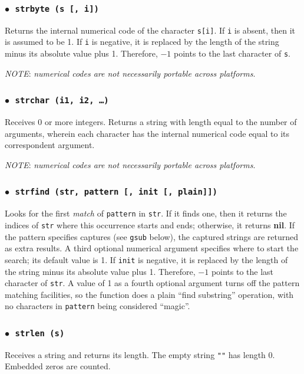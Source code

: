 \documentclass[11pt]{article}
\newcommand{\T}[1]{{\tt #1}}
\newcommand{\Math}[1]{$#1$}
\newcommand{\nil}{{\bf nil}}
\newcommand{\Deffunc}[1]{\index{#1}}
\newcommand{\ff}{$\bullet$\ }
\newcommand{\NOTE}{\par\noindent\emph{NOTE}: }
\begin{document}
\subsubsection*{\ff \T{strbyte (s [, i])}}\Deffunc{strbyte}
Returns the internal numerical code of the character \verb|s[i]|.
If \verb|i| is absent, then it is assumed to be 1.
If \verb|i| is negative,
it is replaced by the length of the string minus its
absolute value plus 1.
Therefore, \Math{-1} points to the last character of \verb|s|.

\NOTE
\emph{numerical codes are not necessarily portable across platforms}.

\subsubsection*{\ff \T{strchar (i1, i2, \ldots)}}\Deffunc{strchar}
Receives 0 or more integers.
Returns a string with length equal to the number of arguments,
wherein each character has the internal numerical code equal
to its correspondent argument.

\NOTE
\emph{numerical codes are not necessarily portable across platforms}.

\subsubsection*{\ff \T{strfind (str, pattern [, init [, plain]])}}
\Deffunc{strfind}
Looks for the first \emph{match} of
\verb|pattern| in \verb|str|.
If it finds one, then it returns the indices of \verb|str|
where this occurrence starts and ends;
otherwise, it returns \nil.
If the pattern specifies captures (see \verb|gsub| below),
the captured strings are returned as extra results.
A third optional numerical argument specifies where to start the search;
its default value is 1.
If \verb|init| is negative,
it is replaced by the length of the string minus its
absolute value plus 1.
Therefore, \Math{-1} points to the last character of \verb|str|.
A value of 1 as a fourth optional argument
turns off the pattern matching facilities,
so the function does a plain ``find substring'' operation,
with no characters in \verb|pattern| being considered ``magic''.

\subsubsection*{\ff \T{strlen (s)}}\Deffunc{strlen}
Receives a string and returns its length.
The empty string \verb|""| has length 0.
Embedded zeros are counted.
\end{document}
